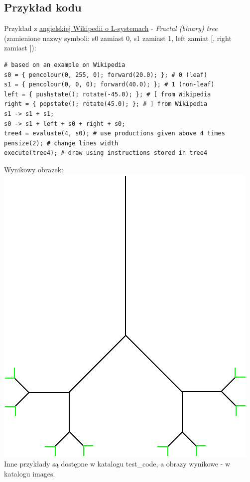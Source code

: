 \documentclass{article}
\begin{document}
\subsection{Przykład kodu}
Przykład z \href{https://en.wikipedia.org/wiki/L-system}{angielskiej Wikipedii o L-systemach} - \textit{Fractal (binary) tree}
(zamienione nazwy symboli: s0 zamiast 0, s1 zamiast 1, left zamiat [, right zamiast ]): 
\begin{lstlisting}
# based on an example on Wikipedia
s0 = { pencolour(0, 255, 0); forward(20.0); }; # 0 (leaf)
s1 = { pencolour(0, 0, 0); forward(40.0); }; # 1 (non-leaf)
left = { pushstate(); rotate(-45.0); }; # [ from Wikipedia
right = { popstate(); rotate(45.0); }; # ] from Wikipedia
s1 -> s1 + s1;
s0 -> s1 + left + s0 + right + s0;
tree4 = evaluate(4, s0); # use productions given above 4 times
pensize(2); # change lines width
execute(tree4); # draw using instructions stored in tree4
\end{lstlisting}
Wynikowy obrazek:
\newline{}
\includegraphics[width=\textwidth]{bintree.png}
Inne przykłady są dostępne w katalogu test\_code, a obrazy wynikowe - w katalogu images.
\end{document}
